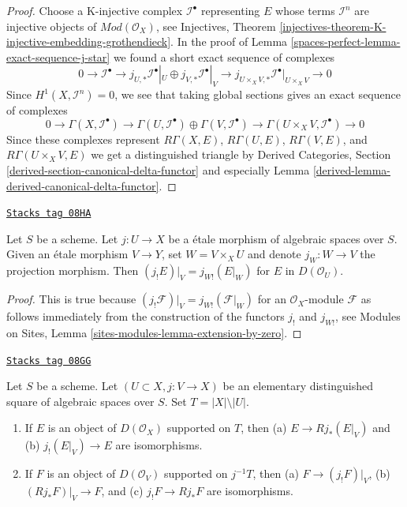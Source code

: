 \begin{proof}
Choose a K-injective complex $\mathcal{I}^\bullet$ representing $E$
whose terms $\mathcal{I}^n$ are injective objects of
$\textit{Mod}(\mathcal{O}_X)$, see Injectives, Theorem
\ref{injectives-theorem-K-injective-embedding-grothendieck}.
In the proof of Lemma \ref{spaces-perfect-lemma-exact-sequence-j-star}
we found a short exact sequence
of complexes
$$
0 \to \mathcal{I}^\bullet \to
j_{U, *}\mathcal{I}^\bullet|_U \oplus j_{V, *}\mathcal{I}^\bullet|_V \to
j_{U \times_X V, *}\mathcal{I}^\bullet|_{U \times_X V} \to 0
$$
Since $H^1(X, \mathcal{I}^n) = 0$, we see that
taking global sections gives an exact sequence of complexes
$$
0 \to \Gamma(X, \mathcal{I}^\bullet) \to
\Gamma(U, \mathcal{I}^\bullet) \oplus
\Gamma(V, \mathcal{I}^\bullet) \to
\Gamma(U \times_X V, \mathcal{I}^\bullet) \to 0
$$
Since these complexes represent
$R\Gamma(X, E)$, $R\Gamma(U, E)$, $R\Gamma(V, E)$, and
$R\Gamma(U \times_X V, E)$ we
get a distinguished triangle by
Derived Categories, Section
\ref{derived-section-canonical-delta-functor} and especially
Lemma \ref{derived-lemma-derived-canonical-delta-functor}.
\end{proof}

\begin{lemma}
\label{spaces-perfect-lemma-restrict-lower-shriek}
\href{https://stacks.math.columbia.edu/tag/08HA}{\texttt{Stacks tag 08HA}}

Let $S$ be a scheme. Let $j : U \to X$ be a \'etale morphism of algebraic
spaces over $S$. Given an \'etale morphism $V \to Y$, set $W = V \times_X U$
and denote $j_W : W \to V$ the projection morphism. Then
$(j_!E)|_V = j_{W!}(E|_W)$ for $E$ in $D(\mathcal{O}_U)$.
\end{lemma}

\begin{proof}
This is true because
$(j_!\mathcal{F})|_V = j_{W!}(\mathcal{F}|_W)$
for an $\mathcal{O}_X$-module $\mathcal{F}$ as follows immediately
from the construction of the functors $j_!$ and $j_{W!}$, see
Modules on Sites, Lemma \ref{sites-modules-lemma-extension-by-zero}.
\end{proof}

\begin{lemma}
\label{spaces-perfect-lemma-pushforward-with-support-in-open}
\href{https://stacks.math.columbia.edu/tag/08GG}{\texttt{Stacks tag 08GG}}

Let $S$ be a scheme. Let $(U \subset X, j : V \to X)$ be an elementary
distinguished square of algebraic spaces over $S$. Set
$T = |X| \setminus |U|$.
\begin{enumerate}
\item If $E$ is an object of $D(\mathcal{O}_X)$ supported on $T$, then
(a) $E \to Rj_*(E|_V)$ and (b) $j_!(E|_V) \to E$ are isomorphisms.
\item If $F$ is an object of $D(\mathcal{O}_V)$ supported on $j^{-1}T$, then
(a) $F \to (j_!F)|_V$, (b) $(Rj_*F)|_V \to F$, and (c)
$j_!F \to Rj_*F$ are isomorphisms.
\end{enumerate}
\end{lemma}

